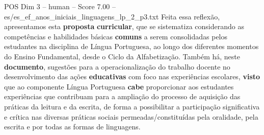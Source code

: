 \begin{textsample}{POS Dim 3 – human – Score 7.00 – es/es\_ef\_anos\_iniciais\_linguagens\_lp\_2\_p3.txt}  \label{ex:f3_pos_004}
Feita essa reflexão, apresentamos esta \textbf{proposta} \textbf{curricular}, que se sistematiza considerando as competências e habilidades básicas \textbf{comuns} a serem consolidadas pelos estudantes na disciplina de Língua Portuguesa, ao longo dos diferentes momentos do Ensino Fundamental, desde o Ciclo da Alfabetização.
Também há, neste \textbf{documento}, sugestões para a operacionalização do trabalho docente no desenvolvimento das ações \textbf{educativas} com foco nas experiências escolares, \textbf{visto} que ao componente Língua Portuguesa \textbf{cabe} proporcionar aos estudantes experiências que contribuam para a ampliação do processo de aquisição das práticas da leitura e da escrita, de forma a possibilitar a participação significativa e crítica nas diversas práticas sociais permeadas/constituídas pela oralidade, pela escrita e por todas as formas de linguagens.

\end{textsample}
